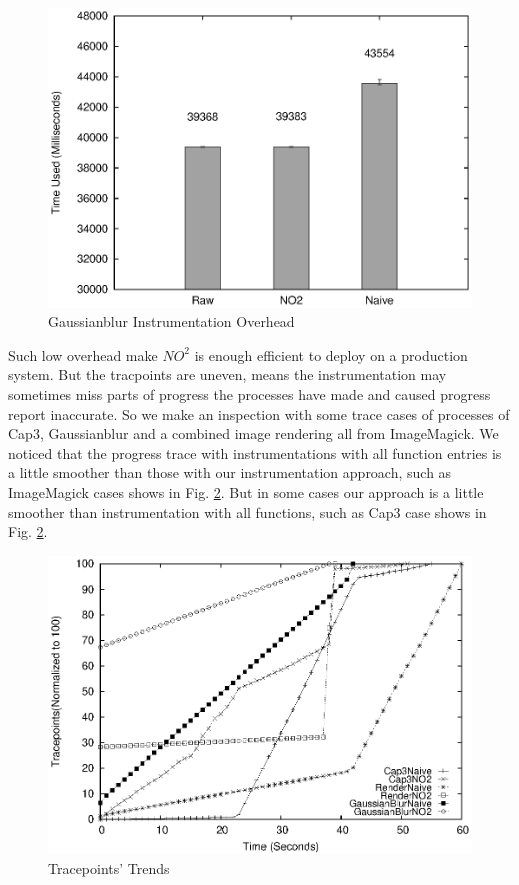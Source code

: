 \begin{figure}
\centering
  \includegraphics[width=0.9\columnwidth]{figures/overhead_gaussianblur.eps}
\caption{Gaussianblur Instrumentation Overhead}
\label{figure:overhead_gaussianblur}
\end{figure}

Such low overhead make $NO^2$ is enough efficient to deploy on a production system. But the tracpoints are uneven, means the instrumentation may sometimes miss parts of progress the processes have made and caused progress report inaccurate. So we make an inspection with some trace cases of processes of Cap3, Gaussianblur and a combined image rendering all from ImageMagick. We noticed that the progress trace with instrumentations with all function entries is a little smoother than those with our instrumentation approach, such as ImageMagick cases shows in Fig. \ref{figure:tracepoints}. But in some cases our approach is a little smoother than instrumentation with all functions, such as Cap3 case shows in Fig. \ref{figure:tracepoints}.

\begin{figure}
\centering
\includegraphics[width=0.9\columnwidth]{figures/tracepoints_all_vs_sampling.eps}
\caption{Tracepoints' Trends}
\label{figure:tracepoints}
\end{figure}


